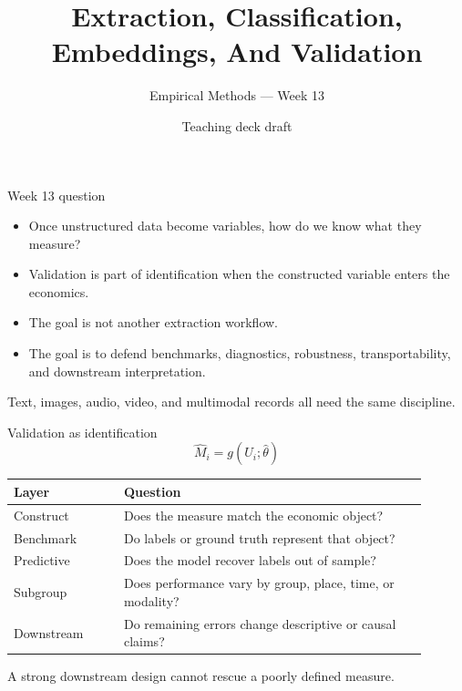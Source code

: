 \documentclass[aspectratio=169,11pt]{beamer}
\title{Extraction, Classification, Embeddings, And Validation}
\subtitle{Empirical Methods --- Week 13}
\author{Teaching deck draft}
\date{}
\newcommand{\1}{\mathbf{1}}
\begin{document}
\begin{frame}
  \titlepage
\end{frame}

\begin{frame}{Week 13 question}
\begin{itemize}
    \item Once unstructured data become variables, how do we know what they measure?
    \item Validation is part of identification when the constructed variable enters the economics.
    \item The goal is not another extraction workflow.
    \item The goal is to defend benchmarks, diagnostics, robustness, transportability, and downstream interpretation.
\end{itemize}

\medskip
Text, images, audio, video, and multimodal records all need the same discipline.
\end{frame}

\begin{frame}{Validation as identification}
\small
\[
\widehat M_i = g(U_i;\widehat\theta)
\]

\begin{tabular}{p{0.24\linewidth} p{0.66\linewidth}}
\toprule
Layer & Question \\
\midrule
Construct & Does the measure match the economic object? \\
Benchmark & Do labels or ground truth represent that object? \\
Predictive & Does the model recover labels out of sample? \\
Subgroup & Does performance vary by group, place, time, or modality? \\
Downstream & Do remaining errors change descriptive or causal claims? \\
\bottomrule
\end{tabular}

\medskip
A strong downstream design cannot rescue a poorly defined measure.
\end{frame}
\end{document}
